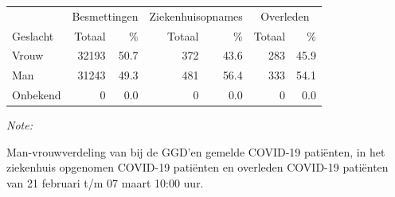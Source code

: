 \documentclass[
  english,
  man,floatsintext]{apa6}
\begin{document}
\begin{table}
\centering\begingroup\fontsize{11}{13}\selectfont

\begin{threeparttable}
\begin{tabular}{lrrrrrr}
\toprule
\multicolumn{1}{c}{ } & \multicolumn{2}{c}{Besmettingen} & \multicolumn{2}{c}{Ziekenhuisopnames} & \multicolumn{2}{c}{Overleden} \\
\cmidrule(l{3pt}r{3pt}){2-3} \cmidrule(l{3pt}r{3pt}){4-5} \cmidrule(l{3pt}r{3pt}){6-7}
Geslacht & Totaal & \% & Totaal & \% & Totaal & \%\\
\midrule
Vrouw & 32193 & 50.7 & 372 & 43.6 & 283 & 45.9\\
Man & 31243 & 49.3 & 481 & 56.4 & 333 & 54.1\\
Onbekend & 0 & 0.0 & 0 & 0.0 & 0 & 0.0\\
\bottomrule
\end{tabular}
\begin{tablenotes}
\item \textit{Note: } 
\item Man-vrouwverdeling van bij de GGD’en gemelde COVID-19 patiënten, in het ziekenhuis opgenomen COVID-19 patiënten en overleden COVID-19 patiënten van 21 februari t/m 07 maart 10:00 uur.
\end{tablenotes}
\end{threeparttable}
\endgroup{}
\end{table}
\newpage
\end{document}
